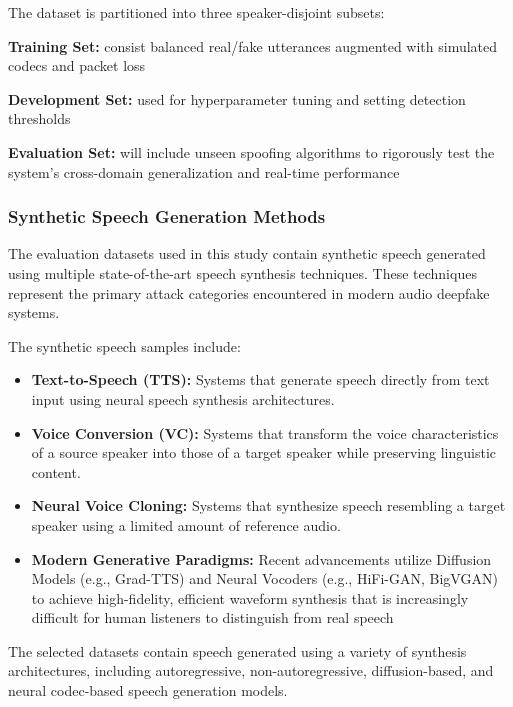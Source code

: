 The dataset is partitioned into three speaker-disjoint subsets:

\textbf{Training Set:} consist balanced real/fake utterances augmented with simulated codecs and packet loss

\textbf{Development Set:} used for hyperparameter tuning and setting detection thresholds

\textbf{Evaluation Set:} will include unseen spoofing algorithms to rigorously test the system’s cross-domain generalization and real-time performance

\subsubsection{Synthetic Speech Generation Methods}

The evaluation datasets used in this study contain synthetic speech generated using multiple state-of-the-art speech synthesis techniques. These techniques represent the primary attack categories encountered in modern audio deepfake systems.

The synthetic speech samples include:

\begin{itemize}
\item \textbf{Text-to-Speech (TTS):} Systems that generate speech directly from text input using neural speech synthesis architectures.

\item \textbf{Voice Conversion (VC):} Systems that transform the voice characteristics of a source speaker into those of a target speaker while preserving linguistic content.

\item \textbf{Neural Voice Cloning:} Systems that synthesize speech resembling a target speaker using a limited amount of reference audio.

\item \textbf{Modern Generative Paradigms:} Recent advancements utilize Diffusion Models (e.g., Grad-TTS) and Neural Vocoders (e.g., HiFi-GAN, BigVGAN) to achieve high-fidelity, efficient waveform synthesis that is increasingly difficult for human listeners to distinguish from real speech
\end{itemize}

The selected datasets contain speech generated using a variety of synthesis architectures, including autoregressive, non-autoregressive, diffusion-based, and neural codec-based speech generation models.

